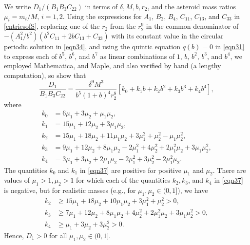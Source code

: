 \documentclass[12pt]{article}
\begin{document}
We write $D_1/(B_1B_3C_{22})$ in terms of $\delta, M, b, r_2$, and the asteroid mass ratios $\mu_i = m_i/M$, $i=1,2$. Using the expressions for $A_1$, $B_2$, $B_4$, $C_{11}$, $C_{13}$, and $C_{33}$ in \eqref{entriesofS}, replacing one of the $r_2$ from the $r_2^9$ in the common denominator of $-(A_1^2/b^2)(b^2C_{11}+2bC_{13}+C_{33})$ with its constant value in the circular periodic solution in \eqref{eqn34}, and using the quintic equation $q(b) = 0$ in \eqref{eqn31} to express each of $b^5$, $b^6$, and $b^7$ as linear combinations of $1$, $b$, $b^2$, $b^3$, and $b^4$, we employed Mathematica, and Maple, and also verified by hand (a lengthy computation), so show that
\[
\frac{D_1}{B_1B_3C_{22}} = \frac{\delta^9M^3}{b^5(1+b)^4r_2^8}\left[k_0 + k_1b + k_2b^2 + k_3b^3 + k_4b^4\right],
\]
where
\begin{align}
k_0 & = 6\mu_1 + 3\mu_2 + \mu_1\mu_2,\nonumber\\
k_1 & = 15\mu_1 + 12\mu_2 + 3\mu_1\mu_2,\nonumber\\
k_2 & = 15\mu_1 + 18\mu_2 + 11\mu_1\mu_2 + 3\mu_1^2 + \mu_2^2 - \mu_1\mu_2^2,\nonumber\\
k_3 & = 9\mu_1 + 12\mu_2 + 8\mu_1\mu_2 - 2\mu_1^2 + 4\mu_2^2 + 2\mu_1^2\mu_2 + 3\mu_1\mu_2^2,\nonumber\\
k_4 & = 3\mu_1 + 3\mu_2 + 2\mu_1\mu_2 - 2\mu_1^2 + 3\mu_2^2 - 2\mu_1^2\mu_2.
\label{eqn37}
\end{align}
The quantities $k_0$ and $k_1$ in \eqref{eqn37} are positive for positive $\mu_1$ and $\mu_2$. There are values of $\mu_1>1,\mu_2>1$ for which each of the quantities $k_2, k_3$, and $k_4$ in \eqref{eqn37} is negative, but for realistic masses (e.g., for $\mu_1,\mu_2 \in (0,1]$), we have
\begin{align*}
k_2 & \geq 15\mu_1 + 18\mu_2 + 10\mu_1\mu_2 + 3\mu_1^2 + \mu_2^2 > 0,\\
k_3 & \geq 7\mu_1 + 12\mu_2 + 8\mu_1\mu_2 + 4\mu_2^2 + 2\mu_1^2\mu_2 + 3\mu_1\mu_2^2 > 0,\\
k_4 & \geq \mu_1 + 3\mu_2 + 3\mu_2^2 > 0.
\end{align*}
Hence, $D_1 > 0$ for all $\mu_1,\mu_2 \in (0,1]$.
\end{document}
